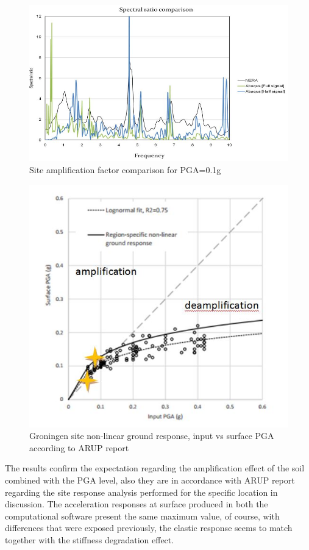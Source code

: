 	\begin{figure}[h!]
		\centering
		\includegraphics[width=0.7\linewidth]{"spectral2"}
		\caption{Site amplification factor comparison for PGA=0.1g}
		\label{SAF}
	\end{figure}
	\begin{figure}[h!]
		\centering
		\includegraphics[width=0.7\linewidth]{"ARUP"}
		\caption{Groningen site non-linear ground response, input vs surface PGA according to ARUP report}
		\label{ARUP}
	\end{figure}
	
	The results confirm the expectation regarding the amplification effect of the soil combined with the PGA level, also they are in accordance with ARUP report regarding the site response analysis performed for the specific location in discussion. The acceleration responses at surface produced in both the computational software present the same maximum value, of course, with differences that were exposed previously, the elastic response seems to match together with the stiffness degradation effect. 
	
